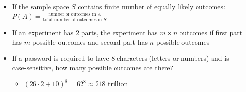\documentclass{article}
\begin{document}
\begin{itemize}
\begin{itemize}
        \begin{itemize}
            \item $A \cup A^c = S$ (definition of complement)
            \item $P(S) = P(A \cup A^c) = 1$ (Axiom 2)
            \item Since $A \cap A^c = 0$ (mutually exclusive), $P(A \cup A^c) = P(A) + P(A^c) = 1$ (Axiom 3)
            \item $\Rightarrow P(A^c) = 1 - P(A)$
        \end{itemize}
        \item $P(A) \le 1$
        \begin{itemize}
            \item $P(A^c) = 1 - P(A)$ (conculsion from above)
            \item $P(A^c) \ge 0$ (Axiom 1)
            \item $0 \le 1 - P(A) \Rightarrow P(A) \le 1$
        \end{itemize}
        \item $P(A \cup B) = P(A) + P(B) - P(A \cap B)$
        \begin{itemize}
            \item $P(A) = P(A \cap B) + P(A \cap B^c)$
            \item $P(B) = P(A \cap B) + P(A^c \cap B)$
            \item $P(A) + P(B) = \underset{P(A \cup B)}{\underbrace{[P(A \cap B) + P(A \cap B^c) + P(A^c \cap B)]}} + P(A \cap B) = P(A \cup B) + P(A \cap B)$
            \item $P(A \cup B) = P(A) + P(B) - P(A \cap B)$
        \end{itemize}
    \end{itemize}
    \item If the sample space $S$ contains finite number of equally likely outcomes: $P(A) = \frac{\text{number of outcomes in } A}{\text{total number of outcomes in } S}$
    \item If an experiment has 2 parts, the experiment has $m \times n$ outcomes if first part has $m$ possible outcomes and second part has $n$ possible outcomes
    \item If a password is required to have 8 characters (letters or numbers) and is case-sensitive, how many possible outcomes are there?
    \begin{itemize}
        \item $(26 \cdot 2 + 10)^8 = 62^8 \approx 218$ trillion
    \end{itemize}

\end{itemize}
\end{document}
